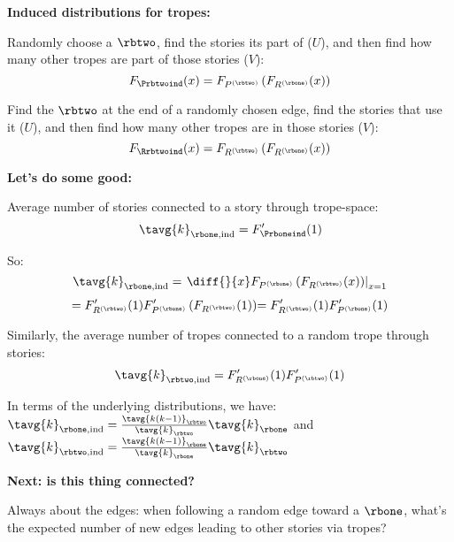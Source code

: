   



  \textbf{Induced distributions for tropes:}
    
    
      Randomly choose a $\rbtwo$, find the stories its part of ($U$),
      and then find how many other tropes are part of those stories ($V$):
      $$
      F_{\Prbtwoind}(x)
      =
      F_{P^{(\rbtwo)}}
      \left(
        F_{R^{(\rbone)}}(x)      
      \right)
      $$
    
      Find the $\rbtwo$ at the end of a randomly chosen edge, 
      find the
      stories that use it ($U$),
      and then find how many other tropes are in those stories
      ($V$):
      $$
      F_{\Rrbtwoind}(x)
      =
      F_{R^{(\rbtwo)}}
      \left(
        F_{R^{(\rbone)}}(x)      
      \right)
      $$
    
  


  \textbf{Let's do some good:}
    
    
      Average number of stories connected to a story
      through trope-space:
      $$
      \tavg{k}_{\rbone,\textnormal{ind}}
      =
      F'_{\Prboneind}(1)
      $$
    
      So:
      $$
      \tavg{k}_{\rbone,\textnormal{ind}}
      =
      \left.
      \diff{}{x}
      F_{P^{(\rbone)}}
      \left(
        F_{R^{(\rbtwo)}}(x)      
      \right)
      \right|_{x=1}
      $$
      $$
      {
      =
      F'_{R^{(\rbtwo)}}(1)
      F'_{P^{(\rbone)}}
      \left(
        F_{R^{(\rbtwo)}}(1)      
      \right)
      }
      {
      =
      F'_{R^{(\rbtwo)}}(1)
      F'_{P^{(\rbone)}}(1)
    }
      $$
    
      Similarly, the 
      average number of tropes connected to a random trope
      through stories:
      $$
      \tavg{k}_{\rbtwo,\textnormal{ind}}
      =
      F'_{R^{(\rbone)}}(1)
      F'_{P^{(\rbtwo)}}(1)
      $$
    
      In terms of the underlying distributions, we have:
      $
      \tavg{k}_{\rbone,\textnormal{ind}}
      = 
      \frac{\tavg{k(k-1)}_{\rbtwo}}
      {\tavg{k}_{\rbtwo}}
      \tavg{k}_{\rbone}
      $
      and
      $
      \tavg{k}_{\rbtwo,\textnormal{ind}}
      = 
      \frac{\tavg{k(k-1)}_{\rbone}}
      {\tavg{k}_{\rbone}}
      \tavg{k}_{\rbtwo}
      $
    
  
  


  \textbf{Next: is this thing connected?}
    
    
      Always about the edges: when following a random edge toward
      a $\rbone$, what's the expected number
      of new edges leading to other stories via tropes?
    
